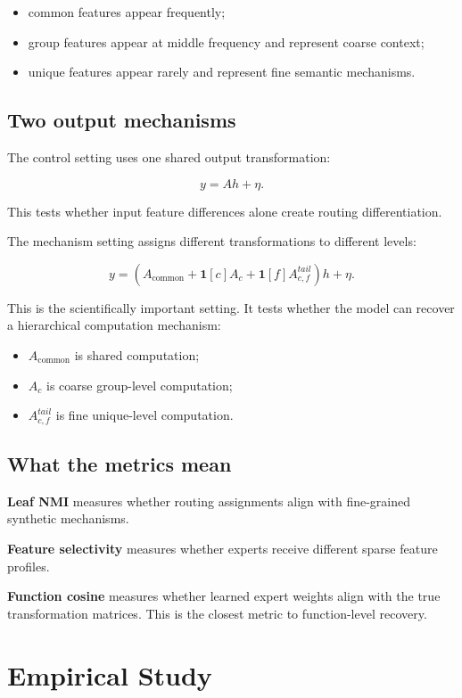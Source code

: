 \documentclass[11pt]{article}
\begin{document}
\begin{itemize}[leftmargin=1.5em]
    \item common features appear frequently;
    \item group features appear at middle frequency and represent coarse context;
    \item unique features appear rarely and represent fine semantic mechanisms.
\end{itemize}

\subsection{Two output mechanisms}

The control setting uses one shared output transformation:

$$
y=Ah+\eta.
$$

This tests whether input feature differences alone create routing differentiation.

The mechanism setting assigns different transformations to different levels:

$$
y=(A_{\text{common}}+\mathbf{1}[c]A_c+\mathbf{1}[f]A_{c,f}^{tail})h+\eta.
$$

This is the scientifically important setting. It tests whether the model can recover a hierarchical computation mechanism:

\begin{itemize}[leftmargin=1.5em]
    \item $A_{\text{common}}$ is shared computation;
    \item $A_c$ is coarse group-level computation;
    \item $A_{c,f}^{tail}$ is fine unique-level computation.
\end{itemize}

\subsection{What the metrics mean}

\textbf{Leaf NMI} measures whether routing assignments align with fine-grained synthetic mechanisms.

\textbf{Feature selectivity} measures whether experts receive different sparse feature profiles.

\textbf{Function cosine} measures whether learned expert weights align with the true transformation matrices. This is the closest metric to function-level recovery.

\section{Empirical Study}
\end{document}
